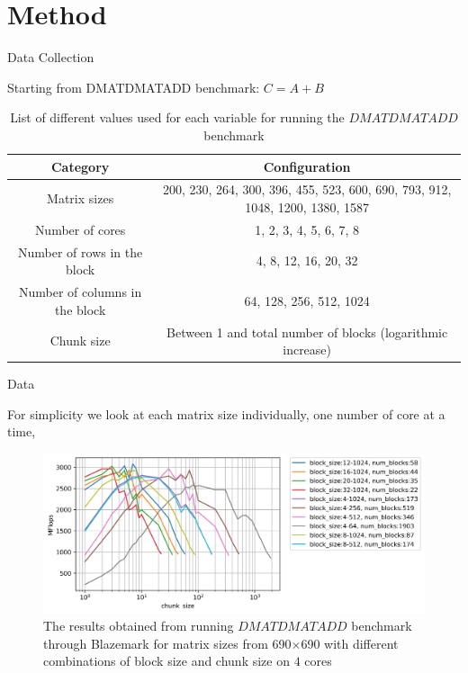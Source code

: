 \documentclass[10pt]{beamer}
\begin{document}
\section{Method}
\begin{frame}{Data Collection}
	\begin{outline}
		\1Starting from DMATDMATADD benchmark: $C=A+B$
	\begin{table}[H]
		\centering
		\resizebox{\textwidth}{!}
		{\begin{tabular}{|c | c |} 
				\hline
				Category & Configuration \\
				\hline
				\hline
				Matrix sizes & 200, 230, 264, 300, 396, 455, 523, 600, 690, 793, 912, 1048, 1200, 1380, 1587 \\ [0.5ex] 
				\hline
				Number of cores & 1, 2, 3, 4, 5, 6, 7, 8 \\ 	
				\hline
				Number of rows in the block & 4, 8, 12, 16, 20, 32 \\
				\hline	
				Number of columns in the block & 64, 128, 256, 512, 1024 \\
				\hline
				Chunk size & Between 1 and total number of blocks (logarithmic increase)\\\hline
		\end{tabular}}
		
		\caption{List of different values used for each variable for running the $DMATDMATADD$ benchmark}
		\label{table1}
	\end{table}
	\end{outline}
\end{frame}


\begin{frame}{Data}
	\begin{outline}
		\1For simplicity we look at each matrix size individually, one number of core at a time, 
		
		
		\begin{figure}
			\includegraphics[width=0.9\linewidth]{images/fig5.png}	
			\caption{The results obtained from running $DMATDMATADD$ benchmark through Blazemark for matrix sizes from 690$\times$690 with different combinations of block size and chunk size on $4$ cores}	
		\end{figure}
	\end{outline}
\end{frame}
\end{document}
